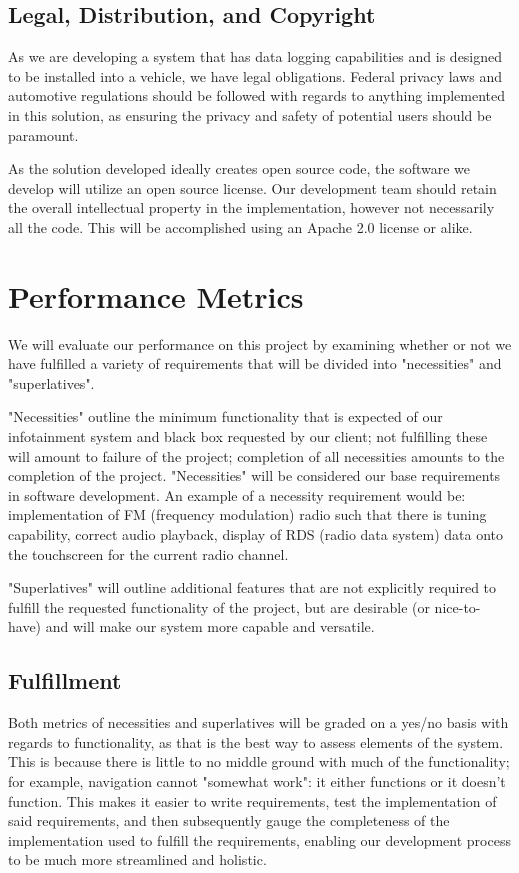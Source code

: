 \documentclass[onecolumn, draftclsnofoot,10pt, compsoc]{IEEEtran}
\begin{document}
\subsection{Legal, Distribution, and Copyright}
As we are developing a system that has data logging capabilities and is designed to be installed into a vehicle, we have legal obligations. Federal privacy laws and automotive regulations should be followed with regards to anything implemented in this solution, as ensuring the privacy and safety of potential users should be paramount.\par
As the solution developed ideally creates open source code, the software we develop will utilize an open source license. Our development team should retain the overall intellectual property in the implementation, however not necessarily all the code. This will be accomplished using an Apache 2.0 license or alike.\par

\section{Performance Metrics}
We will evaluate our performance on this project by examining whether or not we have fulfilled a variety of requirements that will be divided into "necessities" and "superlatives".\par
"Necessities" outline the minimum functionality that is expected of our infotainment system and black box requested by our client; not fulfilling these will amount to failure of the project; completion of all necessities amounts to the completion of the project. "Necessities" will be considered our base requirements in software development. An example of a necessity requirement would be: implementation of FM (frequency modulation) radio such that there is tuning capability, correct audio playback, display of RDS (radio data system) data onto the touchscreen for the current radio channel.\par
"Superlatives" will outline additional features that are not explicitly required to fulfill the requested functionality of the project, but are desirable (or nice-to-have) and will make our system more capable and versatile.\par

\subsection{Fulfillment}
Both metrics of necessities and superlatives will be graded on a yes/no basis with regards to functionality, as that is the best way to assess elements of the system. This is because there is little to no middle ground with much of the functionality; for example, navigation cannot "somewhat work": it either functions or it doesn't function. This makes it easier to write requirements, test the implementation of said requirements, and then subsequently gauge the completeness of the  implementation used to fulfill the requirements, enabling our development process to be much more streamlined and holistic.\par
\end{document}
